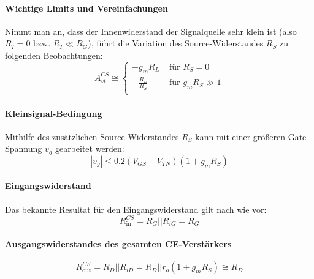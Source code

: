 \documentclass[11pt,a4paper,titlepage]{article}
\begin{document}
\paragraph{Wichtige Limits und Vereinfachungen} Nimmt man an, dass der Innenwiderstand der Signalquelle sehr klein ist (also $R_I=0$ bzw. $R_I \ll R_G$), führt die Variation des Source-Widerstandes $R_S$ zu folgenden Beobachtungen:
\begin{equation} 
A_{vt}^{CS} \cong \begin{cases} 
-g_mR_L & \mbox{ für } R_S = 0 \\
-\frac{R_L}{R_S} & \mbox{ für } g_mR_S \gg 1 \\
\end{cases}
\label{eq:AvSimplCS}
\end{equation}
\paragraph{Kleinsignal-Bedingung} Mithilfe des zusätzlichen Source-Widerstandes $R_S$ kann mit einer größeren Gate-Spannung $v_g$ gearbeitet werden:
\[ |v_g| \leq 0.2(V_{GS}-V_{TN})(1+g_mR_S) \]
\paragraph{Eingangswiderstand}
Das bekannte Resultat für den Eingangswiderstand gilt nach wie vor:
\[ R_{\text{in}}^{CS} = R_G||R_{iG} = R_G \]
\paragraph{Ausgangswiderstandes des gesamten CE-Verstärkers}
\[ R_{\text{out}}^{CS} = R_D||R_{iD} = R_D||r_o\left( 1+g_mR_S \right) \cong R_D \]
\end{document}
